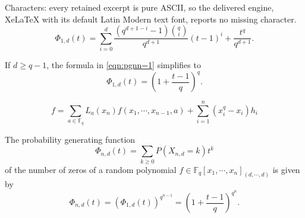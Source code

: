\documentclass[10pt,a4paper]{amsart}
\newcommand{\FF}{\mathbb{F} }
\begin{document}
Characters: every retained excerpt is pure ASCII, so the delivered engine, XeLaTeX with its default Latin Modern text font, reports no missing character.
\begin{equation}\label{eqn:pgnn=1}
    \Phi_{1,d}(t) = \sum_{i=0}^d \frac{(q^{d+1-i}-1){q \choose i}}{q^{d+1}}(t-1)^i + \frac{t^q}{q^{d+1}}.
\end{equation}

\begin{corollary}\label{cor:pgf}
If $d \ge q-1$, the formula in \eqref{eqn:pgnn=1} simplifies to 
\[
    \Phi_{1,d}(t) = \left(1+\frac{t-1}{q}\right)^q.
\]
\end{corollary}

\begin{equation}\label{eqn:interpolation}
f = \sum_{a \in \FF_q}L_a(x_n)f(x_1,\cdots, x_{n-1}, a) + \sum_{i=1}^{n}(x_i^q-x_i)h_i
\end{equation}

\begin{theorem}\label{thm:distribution}
The probability generating function 
\[
    \Phi_{n,d}(t) = \sum_{k \ge 0}P(X_{n,d}=k)t^k
\]
of the number of zeros of a random polynomial $f \in \FF_q[x_1,\cdots,x_n]_{(d, \cdots, d)}$ is given by 
\[
    \Phi_{n,d}(t) = (\Phi_{1,d}(t))^{q^{n-1}} = \left(1+\frac{t-1}{q}\right)^{q^n}.
\]
\end{theorem}
\end{document}
